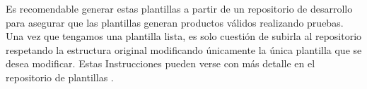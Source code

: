 \documentclass[12pt, a4paper, twoside]{article}
\begin{document}
\begin{umaappendices}
	Es recomendable generar estas plantillas a partir de un repositorio de desarrollo \cite{Dockerfile_template_dev} para asegurar que las plantillas generan productos válidos realizando pruebas.
	Una vez que tengamos una plantilla lista, es solo cuestión de subirla al repositorio respetando la estructura original modificando únicamente la única plantilla que se desea modificar.
	Estas Instrucciones pueden verse con más detalle en el repositorio de plantillas \cite{m4rdom_templates}.




\end{umaappendices}


\end{document}
